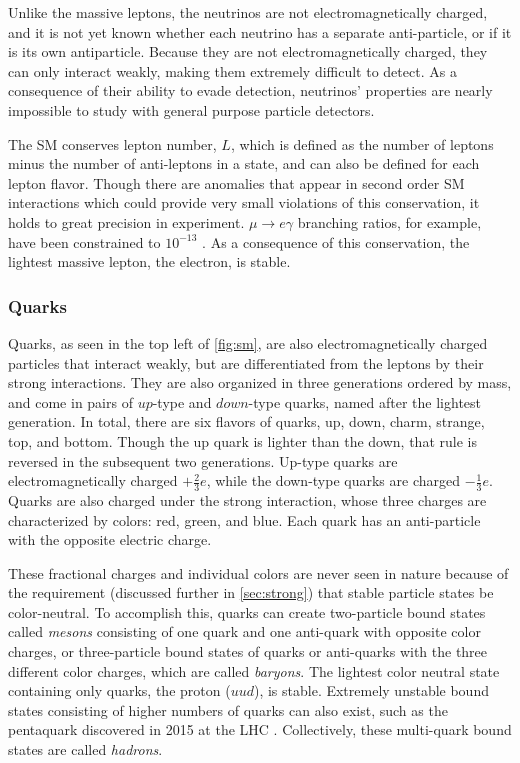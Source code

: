 Unlike the massive leptons, the neutrinos are not electromagnetically charged, and it is not yet known whether each neutrino has a separate anti-particle, or if it is its own antiparticle. Because they are not electromagnetically charged, they can only interact weakly, making them extremely difficult to detect. As a consequence of their ability to evade detection, neutrinos' properties are nearly impossible to study with general purpose particle detectors. 

The \ac{SM} conserves lepton number, $L$, which is defined as the number of leptons minus the number of anti-leptons in a state, and can also be defined for each lepton flavor. Though there are anomalies that appear in second order \ac{SM} interactions which could provide very small violations of this conservation, it holds to great precision in experiment. $\mu \rightarrow e\gamma$ branching ratios, for example, have been constrained to $10^{-13}$ \cite{1605.05081}. As a consequence of this conservation, the lightest massive lepton, the electron, is stable.

\subsubsection{Quarks}
\label{sec:quarks}

Quarks, as seen in the top left of \autoref{fig:sm}, are also electromagnetically charged particles that interact weakly, but are differentiated from the leptons by their strong interactions. They are also organized in three generations ordered by mass, and come in pairs of $up$-type and $down$-type quarks, named after the lightest generation. In total, there are six flavors of quarks, up, down, charm, strange, top, and bottom. Though the up quark is lighter than the down, that rule is reversed in the subsequent two generations. Up-type quarks are electromagnetically charged $+\frac{2}{3}e$, while the down-type quarks are charged $-\frac{1}{3}e$. Quarks are also charged under the strong interaction, whose three charges are characterized by colors: red, green, and blue. Each quark has an anti-particle with the opposite electric charge. 

These fractional charges and individual colors are never seen in nature because of the requirement (discussed further in \autoref{sec:strong}) that stable particle states be color-neutral. To accomplish this, quarks can create two-particle bound states called \textit{mesons} consisting of one quark and one anti-quark with opposite color charges, or three-particle bound states of quarks or anti-quarks with the three different color charges, which are called \textit{baryons}. The lightest color neutral state containing only quarks, the proton ($uud$), is stable. Extremely unstable bound states consisting of higher numbers of quarks can also exist, such as the pentaquark discovered in 2015 at the \ac{LHC} \cite{Pentaquark}. Collectively, these multi-quark bound states are called \textit{hadrons}. 

